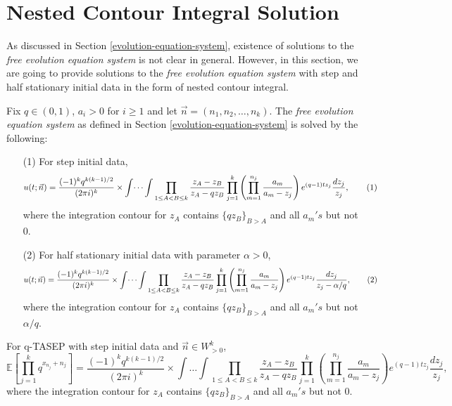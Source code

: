 \section{Nested Contour Integral Solution}
As discussed in Section \ref{evolution-equation-system}, existence of solutions to the \emph{free evolution equation system} is not clear in general. However, in this section, we are going to provide solutions to the \emph{free evolution equation system} with step and half stationary initial data in the form of nested contour integral.

\begin{theorem}
\label{thm:nested-contour-integration}
Fix $q \in (0,1)$, $a_i > 0$ for $i \ge 1$ and let $\vec{n} = (n_1,n_2, \dots, n_k).$ The \emph{free evolution equation system} as defined in Section \ref{evolution-equation-system} is solved by the following:
\begin{enumerate}
\item[(1)] For step initial data, 
\begin{equation}
\label{step-nested-contour}
u(t;\vec{n}) = \frac{(-1)^k q^{k(k-1)/2}}{(2 \pi i)^k} \times \int \dots \int \prod_{1 \le A < B \le k} \frac{z_A - z_B}{z_A - qz_B} \prod_{j=1}^k \left( \prod_{m=1}^{n_j} \frac{a_m}{a_m - z_j}\right) e^{(q-1)tz_j} \frac{dz_j}{z_j}, \numberthis
\end{equation}
where the integration contour for $z_A$ contains $\{qz_B\}_{B > A}$ and all $a_m's$ but not $0$.
\item[(2)] For half stationary initial data with parameter $\alpha > 0$, 
\begin{equation}
\label{half-stationary-nested-contour}
u(t;\vec{n}) = \frac{(-1)^k q^{k(k-1)/2}}{(2 \pi i)^k} \times \int \dots \int \prod_{1 \le A < B \le k} \frac{z_A - z_B}{z_A - qz_B} \prod_{j=1}^k \left( \prod_{m=1}^{n_j} \frac{a_m}{a_m - z_j}\right) e^{(q-1)tz_j} \frac{dz_j}{z_j - \alpha/q}, \numberthis
\end{equation}
where the integration contour for $z_A$ contains $\{qz_B\}_{B > A}$ and all $a_m's$ but not $\alpha / q$.
\end{enumerate}
\end{theorem}

\begin{corollary}
\label{nested-contour-corollary}
For q-TASEP with step initial data and $\vec{n} \in W^k_{>0}$, $$\mathbb{E} \left[ \prod_{j=1}^k q^{x_{n_j}+n_j} \right] = \frac{(-1)^k q^{k(k-1)/2}}{(2 \pi i)^k} \times \int \dots \int \prod_{1 \le A < B \le k} \frac{z_A - z_B}{z_A - qz_B} \prod_{j=1}^k \left( \prod_{m=1}^{n_j} \frac{a_m}{a_m - z_j}\right) e^{(q-1)tz_j} \frac{dz_j}{z_j},$$ where the integration contour for $z_A$ contains $\{qz_B\}_{B > A}$ and all $a_m's$ but not $0$.
\end{corollary}

